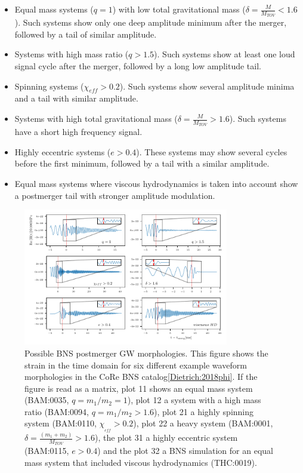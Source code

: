 \begin{itemize}
\item Equal mass systems ($q=1$) with low total gravitational mass ($\delta=\frac{M}{M_{TOV}}<1.6$). Such systems show only one deep amplitude minimum after the merger, followed by a tail of similar amplitude.

\item Systems with high mass ratio ($q>1.5$). Such systems show at least one loud signal cycle after the merger, followed by a long low amplitude tail.

\item Spinning systems ($\chi_{eff}>0.2$). Such systems show several amplitude minima and a tail with similar amplitude.

\item Systems with high total gravitational mass ($\delta=\frac{M}{M_{TOV}}>1.6$). Such systems have a short high frequency signal.

\item Highly eccentric systems ($e>0.4$). These systems may show several cycles before the first minimum, followed by a tail with a similar amplitude.

\item Equal mass systems where viscous hydrodynamics is taken into account show a postmerger tail with stronger amplitude modulation.

\end{itemize}


\begin{figure}[hbt!]
\begin{center}
\includegraphics[width=0.8\textwidth, angle=0]{images/Data_analysis/results/postm_wf_grid.pdf}
\captionsetup{width=0.8\textwidth}
\caption[Possible BNS postmerger GW morphologies]{Possible BNS postmerger GW morphologies. This figure shows the strain in the time domain for six different example waveform morphologies in the CoRe BNS catalog\ref{Dietrich:2018phi}. If the figure is read as a matrix, plot 11 shows an equal mass system (BAM:0035, $q=m_1/m_2=1$), plot 12 a system with a high mass ratio (BAM:0094, $q=m_1/m_2>1.6$), plot 21 a highly spinning system (BAM:0110, $\chi_{_{eff}}>0.2$), plot 22 a heavy system (BAM:0001, $\delta=\frac{(m_1+m_2)}{M_{TOV}}>1.6$), the plot 31 a highly eccentric system (BAM:0115, $e>0.4$) and the plot 32 a BNS simulation for an equal mass system that included viscous hydrodynamics (THC:0019).}
\end{center}
\label{fig:10}
\end{figure}

